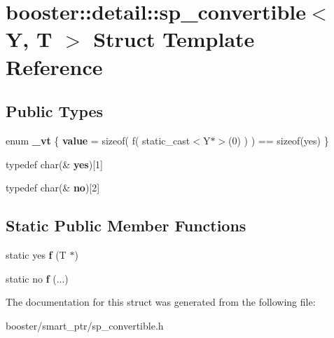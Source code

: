 \section{booster\+:\+:detail\+:\+:sp\+\_\+convertible$<$ Y, T $>$ Struct Template Reference}
\label{structbooster_1_1detail_1_1sp__convertible}
\subsection*{Public Types}
\begin{DoxyCompactItemize}
\item 
enum {\bfseries \+\_\+vt} \{ {\bfseries value} = sizeof( f( static\+\_\+cast$<$Y$\ast$$>$(0) ) ) == sizeof(yes)
 \}\label{structbooster_1_1detail_1_1sp__convertible_afb5e530425c1e767e7f2a8caa71a4fb6}

\item 
typedef char(\& {\bfseries yes})[1]\label{structbooster_1_1detail_1_1sp__convertible_abf5d3f8771631a523e49fa22b835c1d1}

\item 
typedef char(\& {\bfseries no})[2]\label{structbooster_1_1detail_1_1sp__convertible_abe647cfa9f7eedbf8a48bd3885459808}

\end{DoxyCompactItemize}
\subsection*{Static Public Member Functions}
\begin{DoxyCompactItemize}
\item 
static yes {\bfseries f} (T $\ast$)\label{structbooster_1_1detail_1_1sp__convertible_a42352ce32a2cba6574f8422e875bce15}

\item 
static no {\bfseries f} (...)\label{structbooster_1_1detail_1_1sp__convertible_a87c0d2328ecc1cee456147ab904d2328}

\end{DoxyCompactItemize}


The documentation for this struct was generated from the following file\+:\begin{DoxyCompactItemize}
\item 
booster/smart\+\_\+ptr/sp\+\_\+convertible.\+h\end{DoxyCompactItemize}
